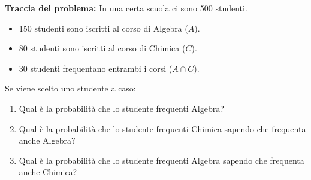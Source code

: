 \begin{esempio}

\textbf{Traccia del problema:}
In una certa scuola ci sono 500 studenti. 
\begin{itemize}
    \item 150 studenti sono iscritti al corso di Algebra ($A$).
    \item 80 studenti sono iscritti al corso di Chimica ($C$).
    \item 30 studenti frequentano entrambi i corsi ($A \cap C$).
\end{itemize}
Se viene scelto uno studente a caso:
\begin{enumerate}
    \item[(a)] Qual è la probabilità che lo studente frequenti Algebra?
    \item[(b)] Qual è la probabilità che lo studente frequenti Chimica sapendo che frequenta anche Algebra?
    \item[(c)] Qual è la probabilità che lo studente frequenti Algebra sapendo che frequenta anche Chimica?
\end{enumerate}

\begin{center}
\end{center}
\end{esempio}

